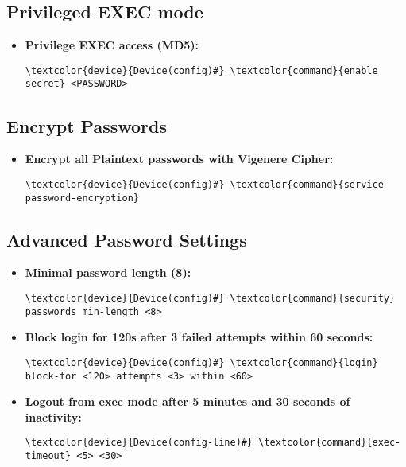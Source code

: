 \documentclass[10pt, a4paper, onecolumn, oneside, titlepage, openany]{book}
\begin{document}
\subsection{Privileged EXEC mode}
\begin{itemize}
    \item \textbf{Privilege EXEC access (MD5):}
\begin{Verbatim}[commandchars=\\\{\}]
\textcolor{device}{Device(config)#} \textcolor{command}{enable secret} <PASSWORD>
\end{Verbatim}
\end{itemize}
\subsection{Encrypt Passwords}
\begin{itemize}
    \item \textbf{Encrypt all Plaintext passwords with Vigenere Cipher:}
\begin{Verbatim}[commandchars=\\\{\}]
\textcolor{device}{Device(config)#} \textcolor{command}{service password-encryption}
\end{Verbatim}
\end{itemize}
\subsection{Advanced Password Settings}
\begin{itemize}
    \item \textbf{Minimal password length (8):}
\begin{Verbatim}[commandchars=\\\{\}]
\textcolor{device}{Device(config)#} \textcolor{command}{security} passwords min-length <8>
\end{Verbatim}
    \item \textbf{Block login for 120s after 3 failed attempts within 60 seconds:}
\begin{Verbatim}[commandchars=\\\{\}]
\textcolor{device}{Device(config)#} \textcolor{command}{login} block-for <120> attempts <3> within <60>
\end{Verbatim}
    \item \textbf{Logout from exec mode after 5 minutes and 30 seconds of inactivity:}
\begin{Verbatim}[commandchars=\\\{\}]
\textcolor{device}{Device(config-line)#} \textcolor{command}{exec-timeout} <5> <30>
\end{Verbatim}
\end{itemize}
\end{document}
